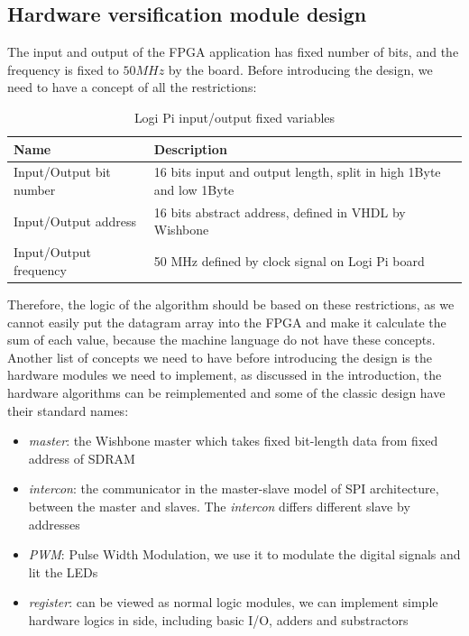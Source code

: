 \documentclass[11pt,openright,a4paper]{report}
\begin{document}
\subsection{Hardware versification module design}
The input and output of the FPGA application has fixed number of bits, and the frequency is fixed to $50MHz$ by the board\cite{logiwishbone}. Before introducing the design, we need to have a concept of all the restrictions:
\begin{table}[H]
	\centering
	\caption{Logi Pi input/output fixed variables}
	\label{my-label}
	\begin{tabular}{@{}ll@{}}
		\toprule
		Name                    & Description                                                         \\ \midrule
		Input/Output bit number & 16 bits input and output length, split in high 1Byte and low 1Byte \\
		Input/Output address    & 16 bits abstract address, defined in VHDL by Wishbone               \\
		Input/Output frequency  & 50 MHz defined by clock signal on Logi Pi board                     \\ \bottomrule
	\end{tabular}
\end{table}
Therefore, the logic of the algorithm should be based on these restrictions, as we cannot easily put the datagram array into the FPGA and make it calculate the sum of each value, because the machine language do not have these concepts.\\
Another list of concepts we need to have before introducing the design is the hardware modules we need to implement, as discussed in the introduction, the hardware algorithms can be reimplemented and some of the classic design have their standard names\cite{chu2011fpga}:
\begin{itemize}
	\item \textit{master}: the Wishbone master which takes fixed bit-length data from fixed address of SDRAM
	\item \textit{intercon}: the communicator in the master-slave model of SPI architecture, between the master and slaves. The \textit{intercon} differs different slave by addresses
	\item \textit{PWM}: Pulse Width Modulation, we use it to modulate the digital signals and lit the LEDs\cite{westinghouse1957pulse}
	\item \textit{register}: can be viewed as normal logic modules, we can implement simple hardware logics in side, including basic I/O, adders and substractors
\end{itemize}
\end{document}
